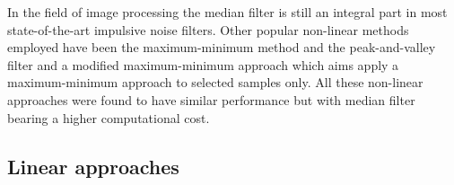 In the field of image processing the median filter is still an integral part in most state-of-the-art impulsive noise filters\cite{Alajlan2004}. Other popular non-linear methods employed have been the maximum-minimum method\cite{Xu1998} and the peak-and-valley filter\cite{Windyga2001} and a modified maximum-minimum approach\cite{Alajlan2004} which aims apply a maximum-minimum approach to selected samples only. All these non-linear approaches were found to have similar performance but with median filter bearing a higher computational cost\cite{Alajlan2004}.

\subsection{Linear approaches}
\cite{Vaseghi1990}



\cite{Czyzewski1995}




\cite{Kundu1984}
%


\cite{Janssen1986}
\cite{Esquef2003}

\cite{Papoulis1975}\cite{Ferreira2001}

\cite{Goodman1986} \cite{Niediwiecki2001}

